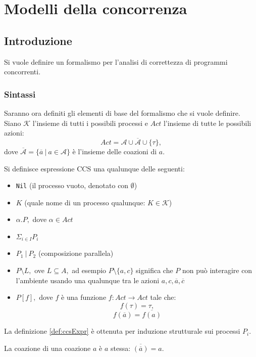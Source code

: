
\chapter{Modelli della concorrenza}

\section{Introduzione}

Si vuole definire un formalismo per l'analisi di correttezza di programmi concorrenti.

\subsection{Sintassi}
Saranno ora definiti gli elementi di base del formalismo che si vuole definire.
	Siano $\mathcal{K}$ l'insieme di tutti i possibili processi e $Act$ l'insieme di tutte le possibili azioni: $$ Act=  \mathcal{A} \cup \overline{\mathcal{A}} \cup \{\tau\},$$ dove $\overline{\mathcal{A}} = \{\overline{a}\ |\ a \in \mathcal{A} \}$ \`e l'insieme delle coazioni di $a$.\\
\begin{deff}
	\label{def:ccsExpr}
	Si definisce espressione CCS una qualunque delle seguenti:
	\begin{itemize}
		\item \texttt{Nil} (il processo vuoto, denotato con $\emptyset$)
		\item $K$ (quale nome di un processo qualunque: $K \in \mathcal{K}$)
		\item $\alpha.P,$ dove $\alpha \in Act$
		\item $ \Sigma_{i \in I} P_i$
		\item $P_1\ |\ P_2$ (composizione parallela)
		\item $P \setminus L,$ ove $ L \subseteq A,$ ad esempio $P \setminus \{a, c\} $ significa che $P$ non pu\`o interagire con l'ambiente usando una qualunque tra le azioni $a, c, \overline{a}, \overline{c}$
		\item $P[f],$ dove $f$ \`e una funzione $f: Act \rightarrow Act$ tale che: $$f(\tau)=\tau,$$
		$$f(\overline{a})=\overline{f(a)} $$
	\end{itemize}
\end{deff}
La definizione \ref{def:ccsExpr} \`e ottenuta per induzione strutturale sui processi $P_i$.
\begin{lemma}
La coazione di una coazione $a$ \`e $a$ stessa: $\overline{(\overline{a})}=a.$
\end{lemma}

